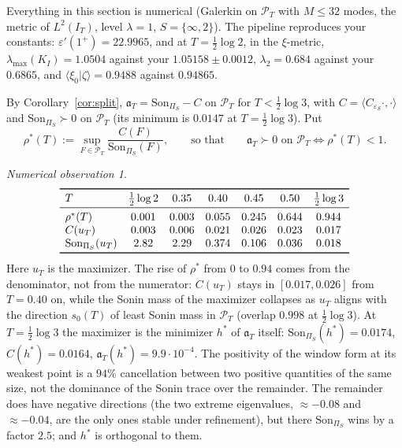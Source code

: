 \documentclass[11pt]{amsart}
\theoremstyle{definition}
\theoremstyle{remark}
\newtheorem{observation}[theorem]{Numerical observation}
\newcommand{\IT}{I_T}
\newcommand{\PT}{\mathcal P_T}
\newcommand{\Son}{\mathrm{Son}}
\begin{document}
Everything in this section is numerical (Galerkin on $\PT$ with $M\le32$ modes, the metric of $L^2(\IT)$, level $\lambda=1$,
$S=\{\infty,2\}$). The pipeline reproduces your constants: $\varepsilon'(1^+)=22.9965$, and at $T=\frac12\log2$, in the
$\xi$-metric, $\lambda_{\max}(K_I)=1.0504$ against your $1.05158\pm0.0012$, $\lambda_2=0.684$ against your $0.6865$, and
$\langle\xi_0|\zeta\rangle=0.9488$ against $0.94865$.

By Corollary~\ref{cor:split}, $\mathfrak a_T=\Son_{\Pi_S}-C$ on $\PT$ for $T<\frac12\log3$, with $C=\langle C_{\varepsilon_S}\cdot,\cdot\rangle$
and $\Son_{\Pi_S}\succ0$ on $\PT$ (its minimum is $0.0147$ at $T=\frac12\log3$). Put
\[
\rho^*(T):=\sup_{F\in\PT}\frac{C(F)}{\Son_{\Pi_S}(F)},\qquad\text{so that}\qquad \mathfrak a_T\succ0\text{ on }\PT\iff\rho^*(T)<1 .
\]

\begin{observation}\label{obs:rho}
\[
\begin{array}{lcccccc}\toprule
T & \tfrac12\log2 & 0.35 & 0.40 & 0.45 & 0.50 & \tfrac12\log3\\ \midrule
\rho^*(T) & 0.001 & 0.003 & 0.055 & 0.245 & 0.644 & 0.944\\
C(u_T) & 0.003 & 0.006 & 0.021 & 0.026 & 0.023 & 0.017\\
\Son_{\Pi_S}(u_T) & 2.82 & 2.29 & 0.374 & 0.106 & 0.036 & 0.018\\ \bottomrule
\end{array}
\]
Here $u_T$ is the maximizer. The rise of $\rho^*$ from $0$ to $0.94$ comes from the denominator, not from the numerator: $C(u_T)$ stays in
$[0.017,0.026]$ from $T=0.40$ on, while the Sonin mass of the maximizer collapses as $u_T$ aligns with the
direction $s_0(T)$ of least Sonin mass in $\PT$ (overlap $0.998$ at $\frac12\log3$). At $T=\frac12\log3$ the maximizer is the
minimizer $h^*$ of $\mathfrak a_T$ itself: $\Son_{\Pi_S}(h^*)=0.0174$, $C(h^*)=0.0164$, $\mathfrak a_T(h^*)=9.9\cdot10^{-4}$. The
positivity of the window form at its weakest point is a $94\%$ cancellation between two positive quantities of the same size,
not the dominance of the Sonin trace over the remainder. The remainder does have negative directions (the two extreme eigenvalues, $\approx-0.08$ and $\approx-0.04$, are the only
ones stable under refinement), but there $\Son_{\Pi_S}$ wins by a factor $2.5$; and $h^*$ is orthogonal to them.
\end{observation}
\end{document}
